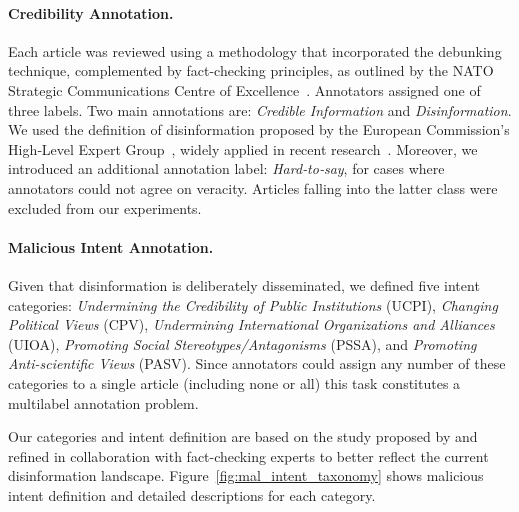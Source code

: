 \documentclass[11pt]{article}
\begin{document}
\paragraph{Credibility Annotation.}
Each article was reviewed using a methodology that incorporated the debunking technique, complemented by fact-checking principles, as outlined by the NATO Strategic Communications Centre of Excellence~\cite{pamment2021fact}. Annotators assigned one of three labels. Two main annotations are: \textit{Credible Information} and \textit{Disinformation}. We used the definition of disinformation proposed by the European Commission’s High‑Level Expert Group~\cite{de2018multi}, widely applied in recent research~\cite{hameleers2023disinformation, modzelewski2024mipd, sosnowski2024eu}. Moreover, we introduced an additional annotation label: \textit{Hard‑to‑say}, for cases where annotators could not agree on veracity.  Articles falling into the latter class were excluded from our experiments.

\paragraph{Malicious Intent Annotation.}
Given that disinformation is deliberately disseminated, we defined five intent categories: \textit{Undermining the Credibility of Public Institutions} (UCPI), \textit{Changing Political Views} (CPV), \textit{Undermining International Organizations and Alliances} (UIOA), \textit{Promoting Social Stereotypes/Antagonisms} (PSSA), and \textit{Promoting Anti-scientific Views} (PASV). Since annotators could assign any number of these categories to a single article (including none or all) this task constitutes a multilabel annotation problem.

Our categories and intent definition are based on the study proposed by \citet{modzelewski2024mipd} and refined in collaboration with fact-checking experts to better reflect the current disinformation landscape. Figure~\ref{fig:mal_intent_taxonomy} shows malicious intent definition and detailed descriptions for each category. 

\end{document}
